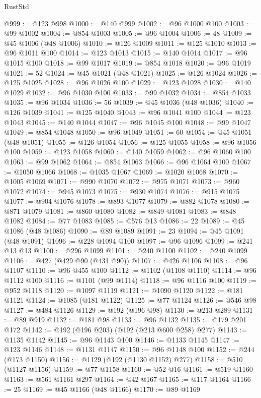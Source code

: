 \begin{lexlean}{RustStd}
\begin{coremodule}
@999 := @123 @998
@1000 := @140 @999
@1002 := @96 @1000 @100
@1003 := @99 @1002
@1004 := @854 @1003
@1005 := @96 @1004
@1006 := 48
@1009 := @45 @1006 (@48 @1006)
@1010 := @126 @1009
@1011 := @125 @1010
@1013 := @96 @1011 @100
@1014 := @123 @1013
@1015 := @140 @1014
@1017 := @96 @1015 @100
@1018 := @99 @1017
@1019 := @854 @1018
@1020 := @96 @1019
@1021 := 52
@1024 := @45 @1021 (@48 @1021)
@1025 := @126 @1024
@1026 := @125 @1025
@1028 := @96 @1026 @100
@1029 := @123 @1028
@1030 := @140 @1029
@1032 := @96 @1030 @100
@1033 := @99 @1032
@1034 := @854 @1033
@1035 := @96 @1034
@1036 := 56
@1039 := @45 @1036 (@48 @1036)
@1040 := @126 @1039
@1041 := @125 @1040
@1043 := @96 @1041 @100
@1044 := @123 @1043
@1045 := @140 @1044
@1047 := @96 @1045 @100
@1048 := @99 @1047
@1049 := @854 @1048
@1050 := @96 @1049
@1051 := 60
@1054 := @45 @1051 (@48 @1051)
@1055 := @126 @1054
@1056 := @125 @1055
@1058 := @96 @1056 @100
@1059 := @123 @1058
@1060 := @140 @1059
@1062 := @96 @1060 @100
@1063 := @99 @1062
@1064 := @854 @1063
@1066 := @96 @1064 @100
@1067 := @1050 @1066
@1068 := @1035 @1067
@1069 := @1020 @1068
@1070 := @1005 @1069
@1071 := @990 @1070
@1072 := @975 @1071
@1073 := @960 @1072
@1074 := @945 @1073
@1075 := @930 @1074
@1076 := @915 @1075
@1077 := @904 @1076
@1078 := @893 @1077
@1079 := @882 @1078
@1080 := @871 @1079
@1081 := @860 @1080
@1082 := @849 @1081
@1083 := @848 @1082
@1084 := @77 @1083
@1085 := @576 @13
@1086 := 22
@1089 := @45 @1086 (@48 @1086)
@1090 := @89 @1089
@1091 := 23
@1094 := @45 @1091 (@48 @1091)
@1096 := @228 @1094 @100
@1097 := @96 @1096
@1099 := @241 @13 @13
@1100 := @296 @1099
@1101 := @240 @1100
@1102 := @240 @1099
@1106 := @427 (@429 @90 (@431 @90))
@1107 := @426 @1106
@1108 := @96 @1107
@1110 := @96 @455 @100
@1112 := @1102 (@1108 @1110)
@1114 := @96 @1112 @100
@1116 := @1101 (@99 @1114)
@1118 := @96 @1116 @100
@1119 := @952 @1118
@1120 := @1097 @1119
@1121 := @1090 @1120
@1122 := @181 @1121
@1124 := @1085 (@181 @1122)
@1125 := @77 @1124
@1126 := @546 @98
@1127 := @484 @1126
@1129 := @192 (@196 @98)
@1130 := @213 @289
@1131 := @89 @919
@1132 := @181 @98
@1133 := @96 @1132
@1135 := @179 @201 @172
@1142 := @192 (@196 @203) (@192 (@213 @600 @258) @277)
@1143 := @1135 @1142
@1145 := @96 @1143 @100
@1146 := @1133 @1145
@1147 := @123 @1146
@1148 := @1131 @1147
@1150 := @96 @1148 @100
@1152 := @244 (@173 @1150)
@1156 := @1129 (@192 (@1130 @1152) @277)
@1158 := @510 (@1127 @1156)
@1159 := @77 @1158
@1160 := @52 @16
@1161 := @519 @1160
@1163 := @561 @1161 @297
@1164 := @42 @167
@1165 := @117 @1164
@1166 := 25
@1169 := @45 @1166 (@48 @1166)
@1170 := @89 @1169

\end{coremodule}
\end{lexlean}
